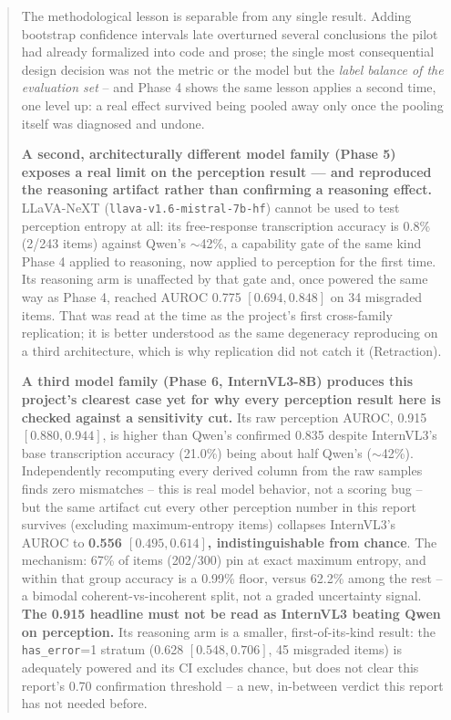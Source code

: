 \documentclass[11pt]{article}
\begin{document}
\begin{abstract}
The methodological lesson is separable from any single result. Adding
bootstrap confidence intervals late overturned several conclusions the pilot
had already formalized into code and prose; the single most consequential
design decision was not the metric or the model but the \emph{label balance
of the evaluation set} -- and Phase 4 shows the same lesson applies a second
time, one level up: a real effect survived being pooled away only once the
pooling itself was diagnosed and undone.

\textbf{A second, architecturally different model family (Phase 5) exposes a
real limit on the perception result --- and reproduced the reasoning artifact
rather than confirming a reasoning effect.}
LLaVA-NeXT (\texttt{llava-v1.6-mistral-7b-hf}) cannot be used to test
perception entropy at all: its free-response transcription accuracy is
0.8\% (2/243 items) against Qwen's $\sim$42\%, a capability gate of the
same kind Phase 4 applied to reasoning, now applied to perception for the
first time. Its reasoning arm is unaffected by that gate and, once powered
the same way as Phase 4, reached AUROC 0.775 $[0.694, 0.848]$ on 34 misgraded
items. That was read at the time as the project's first cross-family
replication; it is better understood as the same degeneracy reproducing on a
third architecture, which is why replication did not catch it (Retraction).

\textbf{A third model family (Phase 6, InternVL3-8B) produces this
project's clearest case yet for why every perception result here is
checked against a sensitivity cut.} Its raw perception AUROC, 0.915
$[0.880, 0.944]$, is higher than Qwen's confirmed 0.835 despite InternVL3's
base transcription accuracy (21.0\%) being about half Qwen's ($\sim$42\%).
Independently recomputing every derived column from the raw samples finds
zero mismatches -- this is real model behavior, not a scoring bug -- but
the same artifact cut every other perception number in this report
survives (excluding maximum-entropy items) collapses InternVL3's AUROC to
\textbf{0.556 $[0.495, 0.614]$, indistinguishable from chance}. The
mechanism: 67\% of items (202/300) pin at exact maximum entropy, and
within that group accuracy is a 0.99\% floor, versus 62.2\% among the
rest -- a bimodal coherent-vs-incoherent split, not a graded uncertainty
signal. \textbf{The 0.915 headline must not be read as InternVL3 beating
Qwen on perception.} Its reasoning arm is a smaller, first-of-its-kind
result: the \texttt{has\_error}=1 stratum (0.628 $[0.548, 0.706]$, 45
misgraded items) is adequately powered and its CI excludes chance, but
does not clear this report's 0.70 confirmation threshold -- a new,
in-between verdict this report has not needed before.
\end{abstract}
\end{document}
